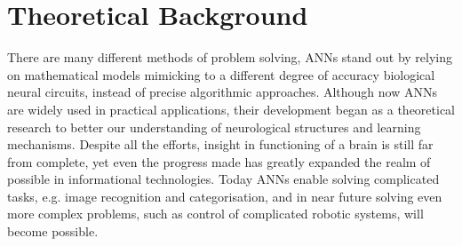 
\chapter{Theoretical Background}\label{chapter:theoretical_background}
There are many different methods of problem solving, ANNs stand out by relying on mathematical models mimicking to a different degree of accuracy biological neural circuits, instead of precise algorithmic approaches. Although now ANNs are widely used in practical applications, their development began as a theoretical research to better our understanding of neurological structures and learning mechanisms. Despite all the efforts, insight in functioning of a brain is still far from complete, yet even the progress made has greatly expanded the realm of possible in informational technologies. Today ANNs enable solving complicated tasks, e.g. image recognition and categorisation, and in near future solving even more complex problems, such as control of complicated robotic systems, will become possible.

